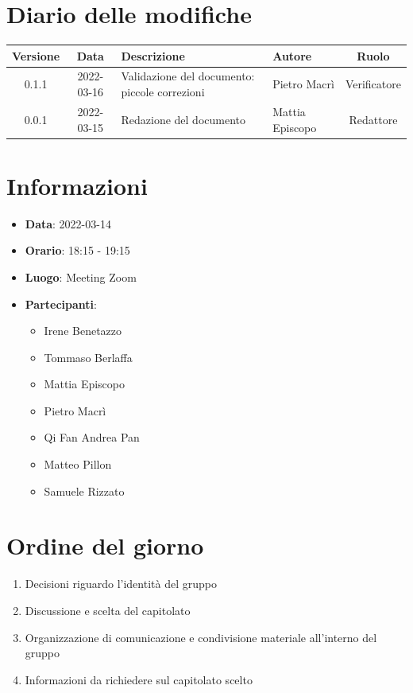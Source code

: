 \documentclass[12pt, a4paper,table]{article}
\begin{document}
	\section*{Diario delle modifiche}
	\begin{center}
	\begin{tabular}{ |c|c|m{9em}|m{5em}|c| }
	\hline
	\textbf{Versione} & \textbf{Data} & \textbf{Descrizione} &  \textbf{Autore} &  \textbf{Ruolo} \\
	\hline
    0.1.1 & 2022-03-16 & Validazione del documento: piccole correzioni & Pietro Macrì & Verificatore\\
	\hline
	0.0.1 & 2022-03-15 & Redazione del documento & Mattia Episcopo & Redattore\\
	\hline
	\end{tabular}
	\end{center}
	\newpage

	\tableofcontents
	\newpage

	\section{Informazioni}
	\begin{itemize}
		\item \textbf{Data}: 2022-03-14
		\item \textbf{Orario}: 18:15 - 19:15
		\item \textbf{Luogo}: Meeting Zoom
		\item \textbf{Partecipanti}:
		\begin{itemize}
			\item Irene Benetazzo
			\item Tommaso Berlaffa
			\item Mattia Episcopo
			\item Pietro Macrì
			\item Qi Fan Andrea Pan
			\item Matteo Pillon
			\item Samuele Rizzato
		\end{itemize}
	\end{itemize}
	\section{Ordine del giorno}
	\begin{enumerate}
		\item Decisioni riguardo l'identità del gruppo
		\item Discussione e scelta del capitolato
		\item Organizzazione di comunicazione e condivisione materiale all'interno del gruppo
		\item Informazioni da richiedere sul capitolato scelto
	\end{enumerate}
	\newpage
\end{document}
